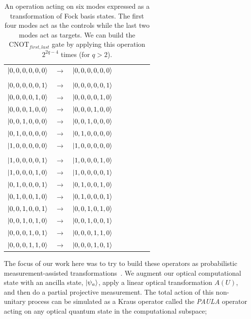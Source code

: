 \documentclass[aps,pra,twocolumn,showpacs,superscriptaddress,floatfix,10pt]{revtex4}
\begin{document}
\begin {table}[h]
\begin{center}
	\begin{tabular}{l*{6}{c}r} 
		$\ket{0,0,0,0,0,0}$  &  $\rightarrow$ & $\ket{0,0,0,0,0,0}$ \\ \\
		$\ket{0,0,0,0,0,1}$  & $\rightarrow$ & $\ket{0,0,0,0,0,1}$ \\
		$\ket{0,0,0,0,1,0}$ & $\rightarrow$ & $\ket{0,0,0,0,1,0}$ \\
		$\ket{0,0,0,1,0,0}$ & $\rightarrow$ & $\ket{0,0,0,1,0,0} $ \\ 
		$\ket{0,0,1,0,0,0}$ & $\rightarrow$ & $\ket{0,0,1,0,0,0} $\\
		$\ket{0,1,0,0,0,0}$ & $\rightarrow$ & $\ket{0,1,0,0,0,0} $ \\
		$\ket{1,0,0,0,0,0}$ & $\rightarrow$ & $\ket{1,0,0,0,0,0} $ \\ \\
		
		$\ket{1,0,0,0,0,1}$  & $\rightarrow$ & $\ket{1,0,0,0,1,0}$ \\
		$\ket{1,0,0,0,1,0}$  & $\rightarrow$ & $\ket{1,0,0,0,0,1}$ \\
		$\ket{0,1,0,0,0,1}$  & $\rightarrow$ & $\ket{0,1,0,0,1,0}$ \\
		$\ket{0,1,0,0,1,0}$  & $\rightarrow$ & $\ket{0,1,0,0,0,1}$ \\
		$\ket{0,0,1,0,0,1}$  & $\rightarrow$ & $\ket{0,0,1,0,1,0}$ \\
		$\ket{0,0,1,0,1,0}$  & $\rightarrow$ & $\ket{0,0,1,0,0,1}$ \\
		$\ket{0,0,0,1,0,1}$  & $\rightarrow$ & $\ket{0,0,0,1,1,0}$ \\
		$\ket{0,0,0,1,1,0}$  & $\rightarrow$ & $\ket{0,0,0,1,0,1}$ \\
	\end{tabular}
	\caption{ \label{Four Controls two Targets} An operation acting on six modes expressed as a transformation of Fock basis states. The first four modes act as the controls while the last two modes act as targets. We can build the $\mbox{CNOT}_{first,last}$ gate by applying this operation $2^{2 q - 4}$ times (for $q>2$).}
\end{center}
\end{table} 
The focus of our work here was to try to build these operators as probabilistic measurement-assisted transformations~\cite{KLM,Uskov}. We augment our optical computational state with an ancilla state, $\ket{\psi_a}$, apply a linear optical transformation $A(U)$, and then do a partial projective measurement. The total action of this non-unitary process can be simulated as a Kraus operator called the \textit{PAULA} operator acting on any optical quantum state in the computational subspace;
\end{document}

